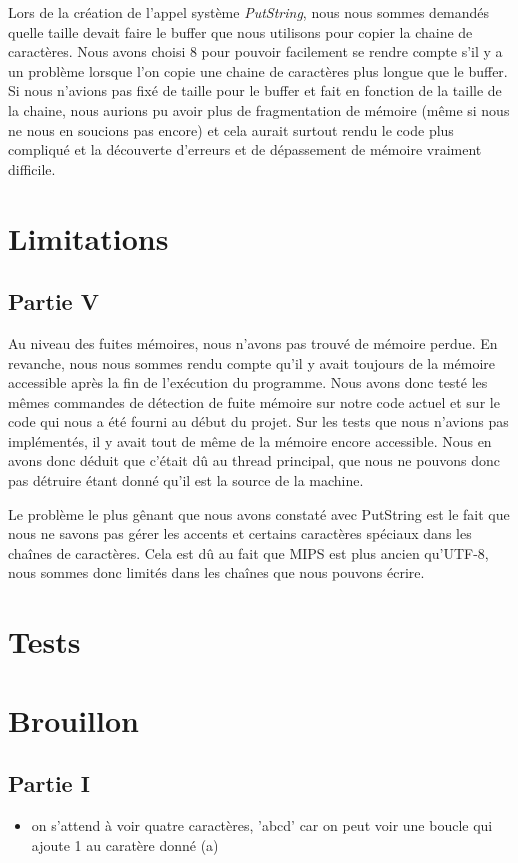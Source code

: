 \documentclass{article}
\begin{document}
    Lors de la création de l'appel système \textit{PutString}, nous nous sommes demandés quelle taille devait faire le buffer que nous utilisons pour copier la chaine de caractères.
Nous avons choisi 8 pour pouvoir facilement se rendre compte s'il y a un problème lorsque l'on copie une chaine de caractères plus longue que le buffer. Si nous
n'avions pas fixé de taille pour le buffer et fait en fonction de la taille de la chaine, nous aurions pu avoir plus de fragmentation de mémoire (même si nous ne nous en soucions pas encore)
et cela aurait surtout rendu le code plus compliqué et la découverte d'erreurs et de dépassement de mémoire vraiment difficile.

\section{Limitations}
\subsection{Partie V}
Au niveau des fuites mémoires, nous n'avons pas trouvé de mémoire perdue.  En revanche, nous nous sommes rendu compte qu'il y avait toujours de la mémoire accessible après la fin de l'exécution du programme.
Nous avons donc testé les mêmes commandes de détection de fuite mémoire sur notre code actuel et sur le code qui nous a été fourni au début du projet. Sur les tests que nous n'avions pas implémentés, il y avait tout de même
de la mémoire encore accessible. Nous en avons donc déduit que c'était dû au thread principal, que nous ne pouvons donc pas détruire étant donné qu'il est la source de la machine.

Le problème le plus gênant que nous avons constaté avec PutString est le fait que nous ne savons pas gérer les accents et certains caractères spéciaux dans les chaînes de caractères.
Cela est dû au fait que MIPS est plus ancien qu'UTF-8, nous sommes donc limités dans les chaînes que nous pouvons écrire.
\section{Tests}

\section{Brouillon}
\subsection{Partie I}
\begin{itemize}
    \item on s'attend à voir quatre caractères, 'abcd' car on peut voir une boucle qui ajoute 1 au caratère donné (a)

    
\end{itemize}
\end{document}
